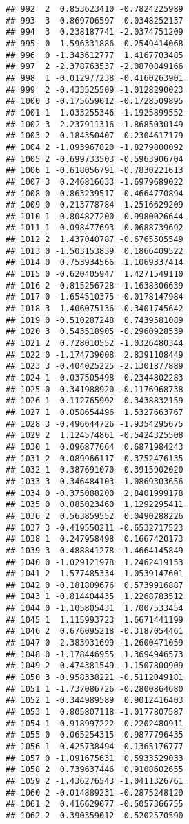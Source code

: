 \documentclass[
]{article}
\begin{document}
\begin{verbatim}
## 992  2  0.853623410 -0.7824225989
## 993  3  0.869706597  0.0348252137
## 994  3  0.238187741 -2.0374751209
## 995  0  1.596331886  0.2549414068
## 996  0 -1.343612777  1.4167703485
## 997  2 -2.378763537 -2.0870849166
## 998  1 -0.012977238 -0.4160263901
## 999  2 -0.433525509 -1.0128290023
## 1000 3 -0.175659012 -0.1728509895
## 1001 1  1.033255346  1.1925899552
## 1002 3  2.237911316 -1.8685030149
## 1003 2  0.184350407  0.2304617179
## 1004 2 -1.093967820 -1.8279800092
## 1005 2 -0.699733503 -0.5963906704
## 1006 1 -0.618056791 -0.7830221613
## 1007 3  0.246816633 -1.6979689022
## 1008 0 -0.863239517  0.4664770894
## 1009 0  0.213778784  1.2516629209
## 1010 1 -0.804827200 -0.9980026644
## 1011 1  0.098477693  0.0688739692
## 1012 2  1.437040787 -0.6765505549
## 1013 0 -1.503153839  0.1866409522
## 1014 0  0.753934566  1.1069337414
## 1015 0 -0.620405947  1.4271549110
## 1016 2 -0.815256728 -1.1638306639
## 1017 0 -1.654510375 -0.0178147984
## 1018 3  1.406075136 -0.3401745642
## 1019 0 -0.510287248  0.7439581089
## 1020 3  0.543518905 -0.2960928539
## 1021 2  0.728010552 -1.0326480344
## 1022 0 -1.174739008  2.8391108449
## 1023 3 -0.404025225 -2.1301877889
## 1024 1 -0.037505498  0.2344802283
## 1025 0 -0.341988920 -0.1176968738
## 1026 1  0.112765992  0.3438832159
## 1027 1  0.058654496  1.5327663767
## 1028 3 -0.496644726 -1.9354295675
## 1029 2  1.124574861 -0.5424325508
## 1030 1  0.096877664  0.6871984243
## 1031 2  0.089966117  0.3752476135
## 1032 1  0.387691070  0.3915902020
## 1033 3  0.346484103 -1.0869303656
## 1034 0 -0.375088200  2.8401999178
## 1035 0  0.085023460  1.1292295411
## 1036 2  0.563859552  0.0490288226
## 1037 3 -0.419550211 -0.6532717523
## 1038 1  0.247958498  0.1667420173
## 1039 3  0.488841278 -1.4664145849
## 1040 0 -1.029121978  1.2462419153
## 1041 2  1.577485334  1.0539147601
## 1042 0 -0.181809676  0.5739916887
## 1043 1 -0.814404435  1.2268783512
## 1044 0 -1.105805431  1.7007533454
## 1045 1  1.115993723  1.6671441199
## 1046 2  0.676095218 -0.3187054461
## 1047 0 -2.383931699 -1.2600471059
## 1048 0 -1.178446955  1.3694946573
## 1049 2  0.474381549 -1.1507800909
## 1050 3 -0.958338221 -0.5112049181
## 1051 1 -1.737086726 -0.2800864680
## 1052 1 -0.344989589  0.9012416403
## 1053 1  0.805807118 -1.0177807587
## 1054 1 -0.918997222  0.2202480911
## 1055 0  0.065254315  0.9877796435
## 1056 1  0.425738494 -0.1365176777
## 1057 0 -1.091675631  0.5933529033
## 1058 2  0.739637446  0.9108602655
## 1059 2 -1.436276543 -1.0411326761
## 1060 2 -0.014889231 -0.2875248120
## 1061 2  0.416629077 -0.5057366755
## 1062 2  0.390359012  0.5202570590

\end{verbatim}
\end{document}
